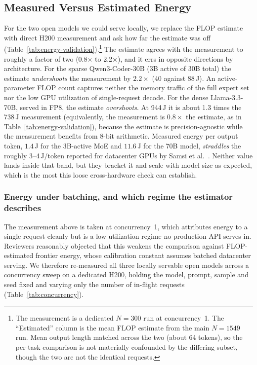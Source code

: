 \documentclass[computers,article,submit,moreauthors]{Definitions/mdpi}
\begin{document}
\subsection{Measured Versus Estimated Energy}\label{sec:energy-validation}
For the two open models we could serve locally, we replace the FLOP estimate with direct H200 measurement and ask how far the estimate was off (Table~\ref{tab:energy-validation}).\footnote{The measurement is a dedicated $N=300$ run at concurrency~1. The ``Estimated'' column is the mean FLOP estimate from the main $N=1549$ run. Mean output length matched across the two (about 64 tokens), so the per-task comparison is not materially confounded by the differing subset, though the two are not the identical requests.} The estimate agrees with the measurement to roughly a factor of two (0.8$\times$ to 2.2$\times$), and it errs in opposite directions by architecture. For the sparse Qwen3-Coder-30B (3B active of 30B total) the estimate \emph{undershoots} the measurement by $2.2\times$ (40 against 88\,J). An active-parameter FLOP count captures neither the memory traffic of the full expert set nor the low GPU utilization of single-request decode. For the dense Llama-3.3-70B, served in FP8, the estimate \emph{overshoots}. At 944\,J it is about 1.3 times the 738\,J measurement (equivalently, the measurement is $0.8\times$ the estimate, as in Table~\ref{tab:energy-validation}), because the estimate is precision-agnostic while the measurement benefits from 8-bit arithmetic. Measured energy per output token, $1.4$\,J for the 3B-active MoE and $11.6$\,J for the 70B model, \emph{straddles} the roughly 3--4\,J/token reported for datacenter GPUs by Samsi et al.~\citep{samsi}. Neither value lands inside that band, but they bracket it and scale with model size as expected, which is the most this loose cross-hardware check can establish.

\subsubsection*{Energy under batching, and which regime the estimator describes}
The measurement above is taken at concurrency~1, which attributes energy to a single request cleanly but is a low-utilization regime no production API serves in. Reviewers reasonably objected that this weakens the comparison against FLOP-estimated frontier energy, whose calibration constant assumes batched datacenter serving. We therefore re-measured all three locally servable open models across a concurrency sweep on a dedicated H200, holding the model, prompt, sample and seed fixed and varying only the number of in-flight requests (Table~\ref{tab:concurrency}).
\end{document}
